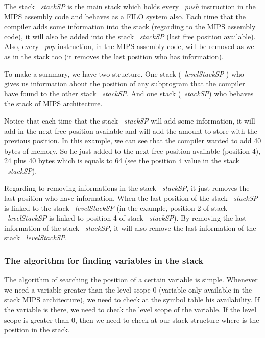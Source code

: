\documentclass[
  oneside,
  11pt, a4paper,
  footinclude=true,
  headinclude=true,
  cleardoublepage=empty
]{scrbook}
\begin{document}
The stack ~\textit{stackSP} is the main stack which holds every ~\textit{push} instruction in the MIPS assembly code and behaves as a FILO system also. Each time that the compiler adds some information into the stack (regarding to the MIPS assembly code), it will also be added into the stack ~\textit{stackSP} (last free position available). Also, every ~\textit{pop} instruction, in the MIPS assembly code, will be removed as well as in the stack too (it removes the last position who has information).

To make a summary, we have two structure. One stack (~\textit{levelStackSP} ) who gives us information about the position of any subprogram that the compiler have found to the other stack ~\textit{stackSP}. And one stack (~\textit{stackSP}) who behaves the stack of MIPS architecture.

Notice that each time that the stack ~\textit{stackSP} will add some information, it will add in the next free position available and will add the amount to store with the previous position. In this example, we can see that the compiler wanted to add 40 bytes of memory. So he just added to the next free position available (position 4), 24 plus 40 bytes which is equals to 64 (see the position 4 value in the stack ~\textit{stackSP}).

Regarding to removing informations in the stack ~\textit{stackSP}, it just removes the last position who have information. When the last position of the stack ~\textit{stackSP} is linked to the stack ~\textit{levelStackSP} (in the example, position 2 of stack ~\textit{levelStackSP} is linked to position 4 of stack ~\textit{stackSP}). By removing the last information of the stack ~\textit{stackSP}, it will also remove the last information of the stack ~\textit{levelStackSP}.

\subsubsection{The algorithm for finding variables in the stack}

The algorithm of searching the position of a certain variable is simple.
Whenever we need a variable greater than the level scope 0 (variable only available in the stack MIPS architecture), we need to check at the symbol table his availability. If the variable is there, we need to check the level scope of the variable. If the level scope is greater than 0, then we need to check at our stack structure where is the position in the stack.
\end{document}
